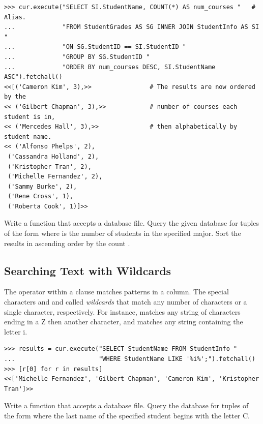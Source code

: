 \begin{lstlisting}
>>> cur.execute("SELECT SI.StudentName, COUNT(*) AS num_courses "   # Alias.
...             "FROM StudentGrades AS SG INNER JOIN StudentInfo AS SI "
...             "ON SG.StudentID == SI.StudentID "
...             "GROUP BY SG.StudentID "
...             "ORDER BY num_courses DESC, SI.StudentName ASC").fetchall()
<<[('Cameron Kim', 3),>>                # The results are now ordered by the
<< ('Gilbert Chapman', 3),>>            # number of courses each student is in,
<< ('Mercedes Hall', 3),>>              # then alphabetically by student name.
<< ('Alfonso Phelps', 2),
 ('Cassandra Holland', 2),
 ('Kristopher Tran', 2),
 ('Michelle Fernandez', 2),
 ('Sammy Burke', 2),
 ('Rene Cross', 1),
 ('Roberta Cook', 1)]>>
\end{lstlisting}

\begin{problem} %
Write a function that accepts a database file.
Query the given database for tuples of the form  where  is the number of students in the specified major.
Sort the results in ascending order by the count .
\end{problem}

\subsection*{Searching Text with Wildcards} %

The  operator within a  clause matches patterns in a  column.
The special characters \lsql{\%} and \lsql{_} and called \emph{wildcards} that match any number of characters or a single character, respectively.
For instance,  matches any string of characters ending in a Z then another character, and  matches any string containing the letter i.

\begin{lstlisting}
>>> results = cur.execute("SELECT StudentName FROM StudentInfo "
...                       "WHERE StudentName LIKE '%i%';").fetchall()
>>> [r[0] for r in results]
<<['Michelle Fernandez', 'Gilbert Chapman', 'Cameron Kim', 'Kristopher Tran']>>
\end{lstlisting}

\begin{problem} %
Write a function that accepts a database file.
Query the database for tuples of the form  where the last name of the specified student begins with the letter C.
\end{problem}

